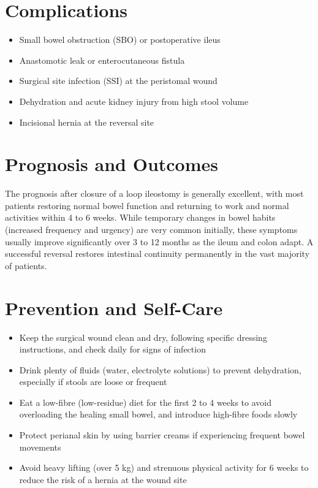 \section*{Complications}
\begin{itemize}
    \item Small bowel obstruction (SBO) or postoperative ileus
    \item Anastomotic leak or enterocutaneous fistula
    \item Surgical site infection (SSI) at the peristomal wound
    \item Dehydration and acute kidney injury from high stool volume
    \item Incisional hernia at the reversal site
\end{itemize}

\section*{Prognosis and Outcomes}
The prognosis after closure of a loop ileostomy is generally excellent, with most patients restoring normal bowel function and returning to work and normal activities within 4 to 6 weeks. While temporary changes in bowel habits (increased frequency and urgency) are very common initially, these symptoms usually improve significantly over 3 to 12 months as the ileum and colon adapt. A successful reversal restores intestinal continuity permanently in the vast majority of patients.

\section*{Prevention and Self-Care}
\begin{itemize}
    \item Keep the surgical wound clean and dry, following specific dressing instructions, and check daily for signs of infection
    \item Drink plenty of fluids (water, electrolyte solutions) to prevent dehydration, especially if stools are loose or frequent
    \item Eat a low-fibre (low-residue) diet for the first 2 to 4 weeks to avoid overloading the healing small bowel, and introduce high-fibre foods slowly
    \item Protect perianal skin by using barrier creams if experiencing frequent bowel movements
    \item Avoid heavy lifting (over 5 kg) and strenuous physical activity for 6 weeks to reduce the risk of a hernia at the wound site
\end{itemize}


